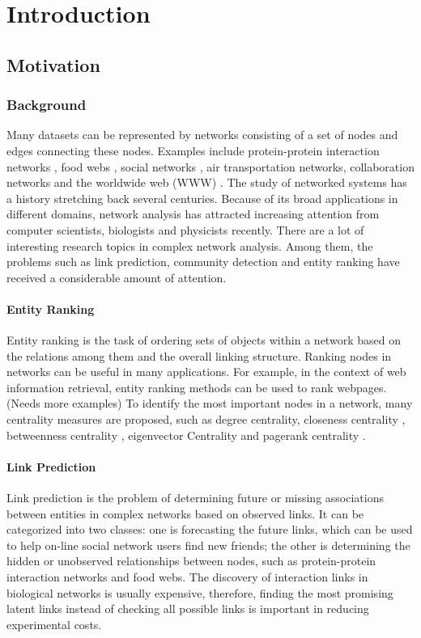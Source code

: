 \documentclass[\main/thesis.tex]{subfiles}
\begin{document}
\chapter{Introduction}

\section{Motivation}
\subsection{Background} \label{background}
Many datasets can be represented by networks consisting of a set of nodes and edges connecting these nodes. Examples include protein-protein interaction networks \cite{krogan2006global}, food webs \cite{williams2000simple}, social networks \cite{shetty2004enron}, air transportation networks, collaboration networks \cite{nascimento2003analysis,leskovec2007graph} and the worldwide web (WWW) \cite{albert1999internet,broder2000graph}. The study of networked systems has a history stretching back several centuries. Because of its broad applications in different domains, network analysis has attracted increasing attention from computer scientists, biologists and physicists recently. There are a lot of interesting research topics in complex network analysis. Among them, the problems such as link prediction, community detection and entity ranking have received a considerable amount of attention.

\subsubsection{Entity Ranking}
Entity ranking is the task of ordering sets of objects within a network based on the relations among them and the overall linking structure. Ranking nodes in networks can be useful in many applications. For example, in the context of web information retrieval, entity ranking methods can be used to rank webpages. (Needs more examples) To identify the most important nodes in a network, many centrality measures are proposed, such as degree centrality, closeness centrality \cite{freeman1978centrality}, betweenness centrality \cite{freeman1977set}, eigenvector Centrality \cite{bonacich1987power} and pagerank centrality \cite{page1999pagerank}.

\subsubsection{Link Prediction}
Link prediction is the problem of determining future or missing associations between entities in complex networks based on observed links. It can be categorized into two classes: one is forecasting the future links, which can be used to help on-line social network users find new friends; the other is determining the hidden or unobserved relationships between nodes, such as protein-protein interaction networks and food webs. The discovery of interaction links in biological networks is usually expensive, therefore, finding the most promising latent links instead of checking all possible links is important in reducing experimental costs.
\end{document}
